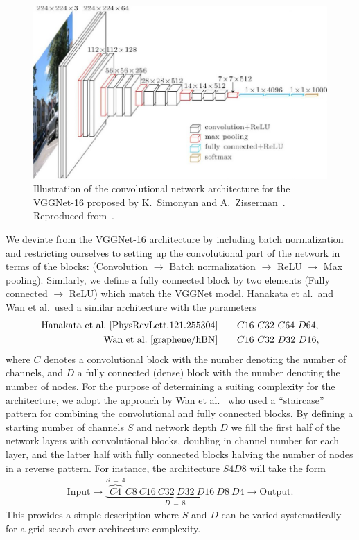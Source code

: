\begin{figure}[!htb]
  \centering
  \includegraphics[width=0.7\linewidth]{figures/ML/VGGNet16.jpg}
  \caption{Illustration of the convolutional network architecture for the VGGNet-16 proposed by K.\ Simonyan and A.\ Zisserman~\cite{simonyan2015deep}. Reproduced from~\cite{VGGNet_16_image}.}
  \label{fig:VGGNet16}
\end{figure}

We deviate from the VGGNet-16 architecture by including batch normalization and restricting ourselves to setting up the convolutional part of the network in terms of the blocks: (Convolution $\to$ Batch normalization $\to$ ReLU $\to$ Max pooling). Similarly, we define a fully connected block by two elements (Fully connected $\to$ ReLU) which match the VGGNet model. Hanakata et al.\ and Wan et al.\ used a similar architecture with the parameters 
\begin{align*}
  \text{Hanakata et al.~\cite{PhysRevLett.121.255304}} & \qquad C16 \ C32 \ C64 \ D64, \\ 
  \text{Wan et al.~\cite{graphene/hBN}} & \qquad C16 \ C32 \ D32 \ D16,
\end{align*}
where $C$ denotes a convolutional block with the number denoting the number of channels, and $D$ a fully connected (dense) block with the number denoting the number of nodes. For the purpose of determining a suiting complexity for the architecture, we adopt the approach by Wan et al.~\cite{graphene/hBN} who used a ``staircase'' pattern for combining the convolutional and fully connected blocks. By defining a starting number of channels $S$ and network depth $D$ we fill the first half of the network layers with convolutional blocks, doubling in channel number for each layer, and the latter half with fully connected blocks halving the number of nodes in a reverse pattern. For instance, the architecture $S4D8$ will take the form
\begin{align}
  \text{Input} \to \underbrace{\overbrace{C4}^{S \ = \ 4}C8 \ C16 \ C32 \ D32 \ D16 \ D8 \ D4}_{D \ = \ 8} \to \text{Output}.
  \label{eq:staircase_example}
\end{align} 
This provides a simple description where $S$ and $D$ can be varied systematically for a grid search over architecture complexity. 


